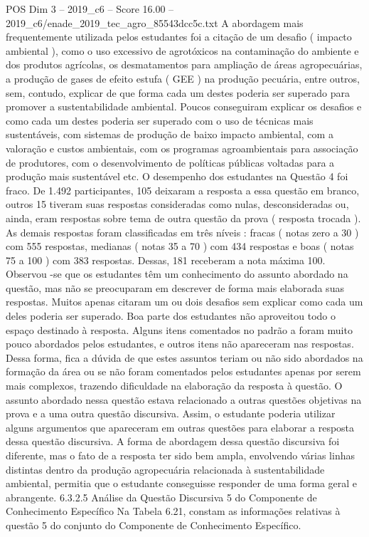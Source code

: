 \begin{textsample}{POS Dim 3 – 2019\_c6 – Score 16.00 – 2019\_c6/enade\_2019\_tec\_agro\_85543dcc5c.txt}
A abordagem mais frequentemente utilizada pelos estudantes foi a citação de um desafio ( impacto ambiental ), como o uso excessivo de agrotóxicos na contaminação do ambiente e dos produtos agrícolas, os desmatamentos para ampliação de áreas agropecuárias, a produção de gases de efeito estufa ( GEE ) na produção pecuária, entre outros, sem, contudo, explicar de que forma cada um destes poderia ser superado para promover a sustentabilidade ambiental.
Poucos conseguiram explicar os desafios e como cada um destes poderia ser superado com o uso de técnicas mais sustentáveis, com sistemas de produção de baixo impacto ambiental, com a valoração e custos ambientais, com os programas agroambientais para associação de produtores, com o desenvolvimento de políticas públicas voltadas para a produção mais sustentável etc.
O desempenho dos estudantes na Questão 4 foi fraco.
De 1.492 participantes, 105 deixaram a resposta a essa questão em branco, outros 15 tiveram suas respostas consideradas como nulas, desconsideradas ou, ainda, eram respostas sobre tema de outra questão da prova ( resposta trocada ).
As demais respostas foram classificadas em três níveis : fracas ( notas zero a 30 ) com 555 respostas, medianas ( notas 35 a 70 ) com 434 respostas e boas ( notas 75 a 100 ) com 383 respostas.
Dessas, 181 receberam a nota máxima 100.
Observou -se que os estudantes têm um conhecimento do assunto abordado na questão, mas não se preocuparam em descrever de forma mais elaborada suas respostas.
Muitos apenas citaram um ou dois desafios sem explicar como cada um deles poderia ser superado.
Boa parte dos estudantes não aproveitou todo o espaço destinado à resposta.
Alguns itens comentados no padrão a foram muito pouco abordados pelos estudantes, e outros itens não apareceram nas respostas.
Dessa forma, fica a dúvida de que estes assuntos teriam ou não sido abordados na formação da área ou se não foram comentados pelos estudantes apenas por serem mais complexos, trazendo dificuldade na elaboração da resposta à questão.
O assunto abordado nessa questão estava relacionado a outras questões objetivas na prova e a uma outra questão discursiva.
Assim, o estudante poderia utilizar alguns argumentos que apareceram em outras questões para elaborar a resposta dessa questão discursiva.
A forma de abordagem dessa questão discursiva foi diferente, mas o fato de a resposta ter sido bem ampla, envolvendo várias linhas distintas dentro da produção agropecuária relacionada à sustentabilidade ambiental, permitia que o estudante conseguisse responder de uma forma geral e abrangente. 6.3.2.5 Análise da Questão Discursiva 5 do Componente de Conhecimento Específico Na Tabela 6.21, constam as informações relativas à questão 5 do conjunto do Componente de Conhecimento Específico.

\end{textsample}
